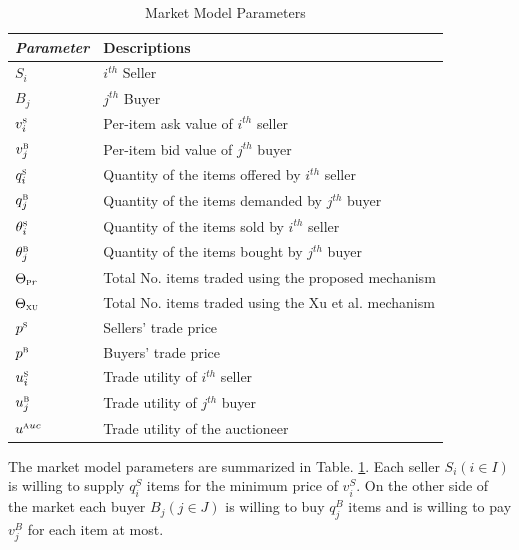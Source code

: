 \begin{table}
    \caption{Market Model Parameters}
    \label{tbl:params}
    \centering
      \begin{tabular}{>{\itshape}ll}
        \toprule
        \upshape Parameter & Descriptions\\\midrule
        $S_i$ & $i^{th}$ Seller\\
        \smallskip
        $B_j$ & $j^{th}$ Buyer\\
        \smallskip
        $v^{\textsc{s}}_{i}$ & Per-item ask value of $i^{th}$ seller\\
        \smallskip
        $v^{\textsc{b}}_{j}$ & Per-item bid value of $j^{th}$ buyer\\
        \smallskip
        $q^{\textsc{s}}_{i}$ & Quantity of the items offered by $i^{th}$ seller\\
        \smallskip
        $q^{\textsc{b}}_{j}$ & Quantity of the items demanded by $j^{th}$ buyer\\
        \smallskip
        $\theta^{\textsc{s}}_{i}$ & Quantity of the items sold by $i^{th}$ seller\\
        \smallskip
        $\theta^{\textsc{b}}_{j}$ & Quantity of the items bought by $j^{th}$ buyer\\
        \smallskip
        $\Theta_{\textsc{p}{\tiny r}}$ & Total No. items traded using the proposed mechanism\\
        \smallskip
        $\Theta_{\textsc{xu}}$ & Total No. items traded using the Xu et al. mechanism\\
        \smallskip
        $p^{\textsc{s}}$ & Sellers' trade price\\
        \smallskip
        $p^{\textsc{b}}$ & Buyers' trade price\\
        \smallskip
        $u^{\textsc{s}}_{i}$ & Trade utility of $i^{th}$ seller\\
        \smallskip
        $u^{\textsc{b}}_{j}$ & Trade utility of $j^{th}$ buyer\\
        \smallskip
        $u^{\textsc{a}{\tiny uc}}$ & Trade utility of the auctioneer\\\bottomrule
      \end{tabular}
  \end{table}


The market model parameters are summarized in Table. \ref{tbl:params}. Each seller $S_{i}(i \in I)$ is willing to supply $q^S_{i}$ items for the minimum price of ${v^S_{i}}$. On the other side of the market each buyer $B_{j} (j \in J)$ is willing to buy $q^B_{j}$ items and is willing to pay $v^B_{j}$ for each item at most.

